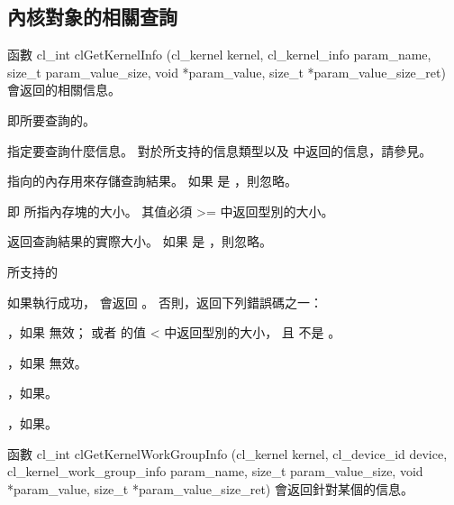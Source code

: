 \subsection{內核對象的相關查詢}

函數
\startclc
cl_int clGetKernelInfo (cl_kernel kernel,
			cl_kernel_info param_name,
			size_t param_value_size,
			void *param_value,
			size_t *param_value_size_ret)
\stopclc
會返回的相關信息。

 即所要查詢的。

 指定要查詢什麼信息。
對於所支持的信息類型以及  中返回的信息，請參見。

 指向的內存用來存儲查詢結果。
如果  是 ，則忽略。

 即  所指內存塊的大小。
其值必須 >= 中返回型別的大小。

 返回查詢結果的實際大小。
如果  是 ，則忽略。

\startbuffer[tblclGetKernelInfo]
 所支持的 
\stopbuffer
{}
{}

如果執行成功，  會返回 。
否則，返回下列錯誤碼之一：
\startigBase
\item {}，如果  無效；
或者  的值 < 中返回型別的大小，
且  不是 。

\item {}，如果  無效。

\item {}，如果\scdevfailres。

\item {}，如果\schostfailres。
\stopigBase

函數
\startclc
cl_int clGetKernelWorkGroupInfo (cl_kernel kernel,
			cl_device_id device,
			cl_kernel_work_group_info param_name,
			size_t param_value_size,
			void *param_value,
			size_t *param_value_size_ret)
\stopclc
會返回針對某個的信息。

